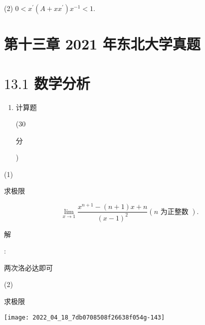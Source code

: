 \documentclass[10pt]{article}
\begin{document}
(2) $0<x^{\prime}\left(A+x x^{\prime}\right) x^{-1}<1$.

\section{第十三章 2021 年东北大学真题}
\section{$13.1$ 数学分析}
\begin{enumerate}
  \item \begin{CJK}{UTF8}{mj}计算题\end{CJK} (30 \begin{CJK}{UTF8}{mj}分\end{CJK})
\end{enumerate}
(1) \begin{CJK}{UTF8}{mj}求极限\end{CJK}
$$
\lim _{x \rightarrow 1} \frac{x^{n+1}-(n+1) x+n}{(x-1)^{2}}(n \text { 为正整数 }) .
$$
\begin{CJK}{UTF8}{mj}解\end{CJK}: \begin{CJK}{UTF8}{mj}两次洛必达即可\end{CJK}

(2) \begin{CJK}{UTF8}{mj}求极限\end{CJK}

\texttt{[image: 2022\_04\_18\_7db0708508f26638f054g-143]}
\end{document}
